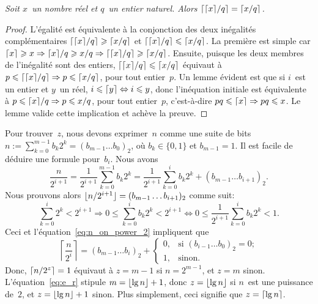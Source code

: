 \begin{itemize}
\begin{thm}
\label{thm_ceilings}
\textsl{Soit \(x\)~un nom\-bre réel et \(q\)~un entier naturel. Alors
  \(\lceil{\lceil{x}\rceil/q}\rceil = \lceil{x/q}\rceil\).}
\end{thm}
\begin{proof}
  L'égalité est équivalente à la conjonction des deux inégalités
  complémentaires \(\lceil{\lceil{x}\rceil/q}\rceil \geqslant \lceil{x/q}\rceil\)
  et \(\lceil{\lceil{x}\rceil/q}\rceil \leqslant \lceil{x/q}\rceil\). La première
  est simple car \(\lceil{x}\rceil \geqslant x \Rightarrow \lceil{x}\rceil/q
  \geqslant x/q \Rightarrow \lceil{\lceil{x}\rceil/q}\rceil \geqslant
  \lceil{x/q}\rceil\). Ensuite, puisque les deux membres de l'inégalité
  sont des entiers, \(\lceil{\lceil{x}\rceil/q}\rceil \leqslant
  \lceil{x/q}\rceil\) équivaut à \(p \leqslant \lceil{\lceil{x}\rceil/q}\rceil
  \Rightarrow p \leqslant \lceil{x/q}\rceil\), pour tout entier~\(p\). Un
  lemme évident est que si \(i\)~est un entier et \(y\)~un réel, \(i
  \leqslant \lceil{y}\rceil \Leftrightarrow i \leqslant y\), donc
  l'inéquation initiale est équivalente à \(p \leqslant \lceil{x}\rceil/q
  \Rightarrow p \leqslant x/q\), pour tout entier~\(p\), c'est-à-dire
  \(pq \leqslant \lceil{x}\rceil \Rightarrow pq \leqslant x\). Le lemme
  valide cette implication et achève la preuve.
 \end{proof}
    \noindent Pour trouver~\(z\), nous devons exprimer~\(n\) comme une
    suite de bits \(n :=\! \sum_{k=0}^{m-1}{b_k2^k} = (b_{m-1}\ldots
    b_0)_2\), où \(b_k \in \{0,1\}\) et \(b_{m-1} = 1\). Il est facile
    de déduire une formule pour~\(b_i\). Nous avons
    \begin{equation}
      \frac{n}{2^{i+1}}
      = \frac{1}{2^{i+1}}\sum_{k=0}^{m-1}{b_k2^{k}}
      = \frac{1}{2^{i+1}}\sum_{k=0}^{i}{b_k2^k} + (b_{m-1}\dots b_{i+1})_2.
      \label{eq:n_on_power_2}
    \end{equation}
    Nous prouvons alors \(\lfloor{n/2^{i+1}}\rfloor = (b_{m-1}\dots
    b_{i+1})_2\) comme suit:
    \begin{equation*}
      \sum_{k=0}^{i}{2^k} < 2^{i+1}
      \Rightarrow
      0 \leqslant \sum_{k=0}^{i}{b_k2^k} < 2^{i+1}
      \Leftrightarrow
      0 \leqslant \frac{1}{2^{i+1}}\sum_{k=0}^{i}{b_k2^k} < 1.
    \end{equation*}
    Ceci et l'équation~\eqref{eq:n_on_power_2} impliquent que
    \begin{equation*}
      \left\lceil\frac{n}{2^i}\right\rceil =
      (b_{m-1}\dots b_i)_2
      + \begin{cases}
          0, & \text{si \((b_{i-1}\dots b_0)_2=0\)};\\
          1, & \text{sinon}.
        \end{cases}
    \end{equation*}
    Donc, \(\lceil{n/2^z}\rceil = 1\) équivaut à \(z=m-1\) si
    \(n=2^{m-1}\), et \(z=m\) sinon. L'équation~\eqref{eq:e_r}
     stipule \(m = \lfloor{\lg n}\rfloor + 1\), donc
    \(z=\lfloor{\lg n}\rfloor\) si \(n\)~est une puissance de~\(2\), et
    \(z=\lfloor{\lg n}\rfloor + 1\) sinon. Plus simplement, ceci signifie que
    \(z=\lceil{\lg n}\rceil\).


\end{itemize}
